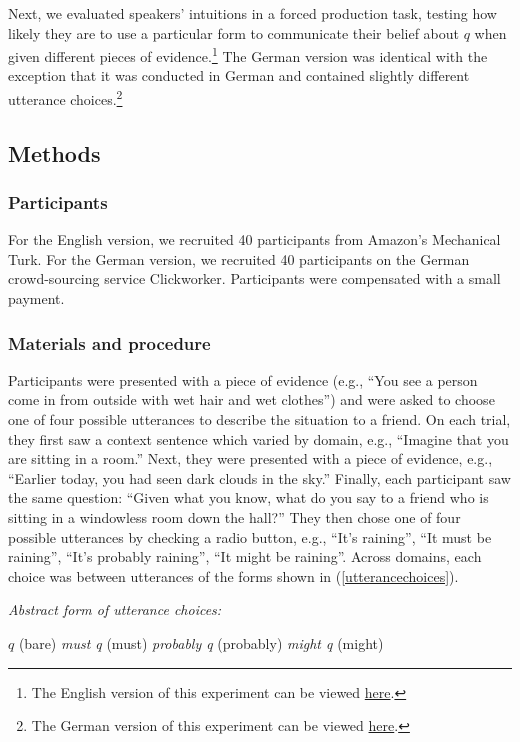 \documentclass[11pt]{article}
\newcommand{\eref}[1]{(\ref{#1})}
\begin{document}
Next, we evaluated speakers' intuitions in a forced production task, testing how likely they are to use a particular form to communicate their belief about $q$ when given different pieces of evidence.\footnote{The English version of this experiment can be viewed \href{http://stanford.edu/~jdegen/71_modals_forced_production/modals.html}{here}.} The German version was identical with the exception that it was conducted in German and contained slightly different utterance choices.\footnote{The German version of this experiment can be viewed \href{http://web.stanford.edu/~jdegen/cgi-bin/3_dp_production/modals.html}{here}.}

\subsection{Methods}

\subsubsection{Participants}

For the English version, we recruited 40 participants from Amazon's Mechanical Turk. For the German version, we recruited 40 participants on the German crowd-sourcing service Clickworker. Participants were compensated with a small payment.

\subsubsection{Materials and procedure}

Participants were presented with a piece of evidence (e.g., ``You see a person come in from outside with wet hair and wet clothes'') and were asked to choose one of four possible utterances to describe the situation to a friend. On each trial, they first saw a context sentence which varied by domain, e.g., ``Imagine that you are sitting in a room.'' Next, they were presented with a piece of evidence, e.g., ``Earlier today, you had seen dark clouds in the sky.'' Finally, each participant saw the same question: ``Given what you know, what do you say to a friend who is sitting in a windowless room down the hall?'' They then chose one of four possible utterances by checking a radio button, e.g., ``It's raining'', ``It must be raining'', ``It's probably raining'', ``It might be raining''. Across domains, each choice was between utterances of the forms shown in \eref{utterancechoices}.

\begin{exe}
	\ex\label{utterancechoices} \emph{Abstract form of utterance choices:}
	\begin{xlist}
		\ex $q$ (bare)
		\ex \emph{must q} (must)
		\ex \emph{probably q} (probably)
		\ex \emph{might q} (might)
		\end{xlist}
		\end{exe}
		
\end{document}
